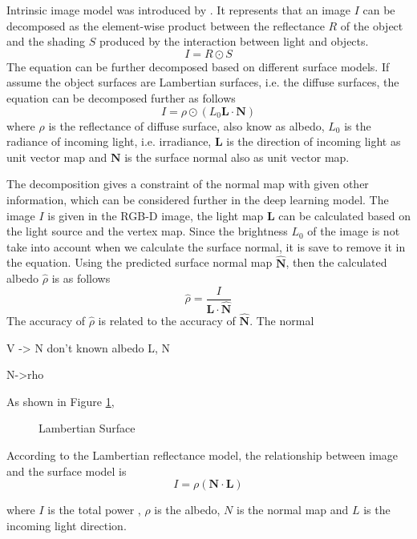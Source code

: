 \documentclass[]{article}
\begin{document}
Intrinsic image model was introduced by \cite{intrinsic-image}. It represents that an image $ I $ can be decomposed as the element-wise product between the reflectance $ R $ of the object and the shading $ S $ produced by the interaction between light and objects.
\[ I =R  \odot S\]
The equation can be further decomposed based on different surface models. If assume the object surfaces are Lambertian surfaces, i.e. the diffuse surfaces, the equation can be decomposed further as follows
\[ I = \rho  \odot (L_0 \textbf{L} \cdot  \textbf{N}) \]
where $ \rho $ is the reflectance of diffuse surface, also know as albedo, $ L_0 $ is the radiance of  incoming light, i.e. irradiance, $ \textbf{L} $ is the direction of incoming light as unit vector map and $ \textbf{N} $ is the surface normal also as unit vector map.

The decomposition gives a constraint of the normal map with given other information, which can be considered further in the deep learning model. The image $ I $ is given in the RGB-D image, the light map $ \textbf{L} $ can be calculated based on the light source and the vertex map. Since the brightness $ L_0 $ of the image is not take into account when we calculate the surface normal, it is save to remove it in the equation. Using the predicted surface normal map $  \bm{\hat{N}} $, then the calculated albedo $ \hat\rho $ is as follows
\[ \hat\rho = \frac{I}{\textbf{L} \cdot  \bm{\hat{N}} }  \]
The accuracy of $ \hat\rho $ is related to the accuracy of $  \bm{\hat{N}} $. The normal 

V -> N
don't known albedo
L, N


N->rho




\newpage 
 As shown in Figure \ref{fig:lambertian-surface}, 
\begin{figure}[th]
	\centering
	\caption{Lambertian Surface}
	\label{fig:lambertian-surface}
\end{figure}
According to the Lambertian reflectance model, the relationship between image and the surface model is 
\[ I = \rho (\textbf{N} \cdot \textbf{L}) \]

where $ I $ is the total power , $ \rho $ is the albedo,  $ N $ is the normal map and $ L $ is the incoming light direction.
\end{document}
